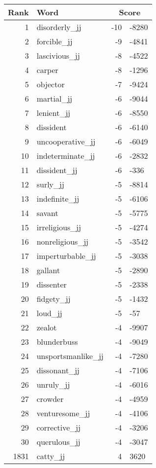 \begin{longtable}[!htbp]{| rlr@{.}l |}
    \hline
    \textbf{Rank} & \textbf{Word} & \multicolumn{2}{c|}{\textbf{Score}} \\
    \hline
    \endhead
    1 & disorderly\_jj & -10 & -8280 \\
    2 & forcible\_jj & -9 & -4841 \\
    3 & lascivious\_jj & -8 & -4522 \\
    4 & carper & -8 & -1296 \\
    5 & objector & -7 & -9424 \\
    6 & martial\_jj & -6 & -9044 \\
    7 & lenient\_jj & -6 & -8550 \\
    8 & dissident & -6 & -6140 \\
    9 & uncooperative\_jj & -6 & -6049 \\
    10 & indeterminate\_jj & -6 & -2832 \\
    11 & dissident\_jj & -6 & -336 \\
    12 & surly\_jj & -5 & -8814 \\
    13 & indefinite\_jj & -5 & -6106 \\
    14 & savant & -5 & -5775 \\
    15 & irreligious\_jj & -5 & -4274 \\
    16 & nonreligious\_jj & -5 & -3542 \\
    17 & imperturbable\_jj & -5 & -3038 \\
    18 & gallant & -5 & -2890 \\
    19 & dissenter & -5 & -2338 \\
    20 & fidgety\_jj & -5 & -1432 \\
    21 & loud\_jj & -5 & -57 \\
    22 & zealot & -4 & -9907 \\
    23 & blunderbuss & -4 & -9049 \\
    24 & unsportsmanlike\_jj & -4 & -7280 \\
    25 & dissonant\_jj & -4 & -7106 \\
    26 & unruly\_jj & -4 & -6016 \\
    27 & crowder & -4 & -4959 \\
    28 & venturesome\_jj & -4 & -4106 \\
    29 & corrective\_jj & -4 & -3206 \\
    30 & querulous\_jj & -4 & -3047 \\
    1831 & catty\_jj & 4 & 3620 \\

\end{longtable}
